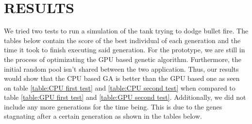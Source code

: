 \chapter{RESULTS}
We tried two tests to run a simulation of the tank trying to dodge bullet fire. 
The tables below contain the score of the best individual of each generation and
the time
it took to finish executing said generation. For the prototype, we are still in
the process of optimizating the GPU
based genetic algorithm. Furthermore, the initial random pool isn't shared between the two application.
Thus, our results would show that the CPU based GA is better than the GPU based one as seen on table 
\ref{table:CPU first test} and \ref{table:CPU second test} when compared to table \ref{table:GPU first test} and 
\ref{table:GPU second test}. Additionally, we did not include any more generations for the time being. This is due to
the genes stagnating after a certain generation as shown in the tables below.


